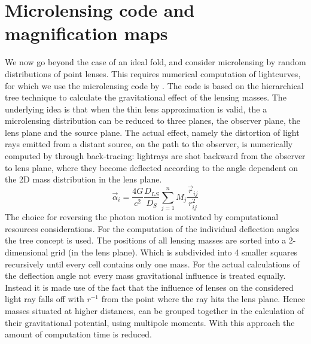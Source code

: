 \section{Microlensing code and magnification maps}

We now go beyond the case of an ideal fold, and consider microlensing
by random distributions of point lenses.  This requires numerical
computation of lightcurves, for which we use the microlensing code by
\cite{1999A&A...346L...5W}. The code is based on the hierarchical tree
technique to calculate the gravitational effect of the lensing
masses. The underlying idea is that when the thin lens approximation
is valid, the a microlensing distribution can be reduced to three
planes, the observer plane, the lens plane and the source plane. The
actual effect, namely the distortion of light rays emitted from a
distant source, on the path to the observer, is numerically computed
by through back-tracing: lightrays are shot backward from the observer
to lens plane, where they become deflected according to the angle
dependent on the 2D mass distribution in the lens plane.
\begin{equation}
\vec{\alpha}_{i}=\frac{4G}{c^{2}} \frac{D_{LS}}{D_{S}}\sum_{j=1}^{n}M_j \frac{\vec{r}_{ij}}{r^2_{ij}} 
\end{equation}  
The choice for reversing the photon motion is motivated by computational resources considerations. 
For the computation of the individual deflection angles the tree concept is used. The positions of all lensing masses are sorted into a 2-dimensional grid (in the lens plane). Which is subdivided into 4 smaller squares recursively until every cell contains only one mass. For the actual calculations of the deflection angle not every mass gravitational influence is treated equally. Instead it is made use of the fact that the influence of lenses on the considered light ray falls off with $r^{-1}$ from the point where the ray hits the lens plane. Hence masses situated at higher distances, can be grouped together in the calculation of their gravitational potential, using multipole moments. With this approach the amount of computation time is reduced. \\


